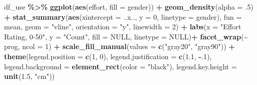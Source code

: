 \documentclass[
]{article}
\newenvironment{Shaded}{\begin{snugshade}}{\end{snugshade}}
\newcommand{\AttributeTok}[1]{\textcolor[rgb]{0.13,0.29,0.53}{#1}}
\newcommand{\ConstantTok}[1]{\textcolor[rgb]{0.56,0.35,0.01}{#1}}
\newcommand{\DecValTok}[1]{\textcolor[rgb]{0.00,0.00,0.81}{#1}}
\newcommand{\FloatTok}[1]{\textcolor[rgb]{0.00,0.00,0.81}{#1}}
\newcommand{\FunctionTok}[1]{\textcolor[rgb]{0.13,0.29,0.53}{\textbf{#1}}}
\newcommand{\NormalTok}[1]{#1}
\newcommand{\SpecialCharTok}[1]{\textcolor[rgb]{0.81,0.36,0.00}{\textbf{#1}}}
\newcommand{\StringTok}[1]{\textcolor[rgb]{0.31,0.60,0.02}{#1}}
\begin{document}
\clearpage

\begin{Shaded}
\begin{Highlighting}[]
\NormalTok{df\_use }\SpecialCharTok{\%\textgreater{}\%} 
  \FunctionTok{ggplot}\NormalTok{(}\FunctionTok{aes}\NormalTok{(effort,}
             \AttributeTok{fill =}\NormalTok{ gender)) }\SpecialCharTok{+} 
  \FunctionTok{geom\_density}\NormalTok{(}\AttributeTok{alpha =}\NormalTok{ .}\DecValTok{5}\NormalTok{) }\SpecialCharTok{+}  
  \FunctionTok{stat\_summary}\NormalTok{(}\FunctionTok{aes}\NormalTok{(}\AttributeTok{xintercept =}\NormalTok{ ..x.., }
                   \AttributeTok{y =} \DecValTok{0}\NormalTok{,}
                   \AttributeTok{linetype =}\NormalTok{ gender), }
               \AttributeTok{fun =}\NormalTok{ mean, }
               \AttributeTok{geom =} \StringTok{"vline"}\NormalTok{, }
               \AttributeTok{orientation =} \StringTok{"y"}\NormalTok{,}
               \AttributeTok{linewidth =} \DecValTok{2}\NormalTok{) }\SpecialCharTok{+}
  \FunctionTok{labs}\NormalTok{(}\AttributeTok{x =} \StringTok{"Effort Rating, 0{-}50"}\NormalTok{,}
       \AttributeTok{y =} \StringTok{"Count"}\NormalTok{,}
       \AttributeTok{fill =} \ConstantTok{NULL}\NormalTok{,}
       \AttributeTok{linetype =} \ConstantTok{NULL}\NormalTok{)}\SpecialCharTok{+}
  \FunctionTok{facet\_wrap}\NormalTok{(}\SpecialCharTok{\textasciitilde{}}\NormalTok{ prog, }\AttributeTok{ncol =} \DecValTok{1}\NormalTok{) }\SpecialCharTok{+}
  \FunctionTok{scale\_fill\_manual}\NormalTok{(}\AttributeTok{values =} \FunctionTok{c}\NormalTok{(}\StringTok{"gray20"}\NormalTok{, }\StringTok{"gray90"}\NormalTok{)) }\SpecialCharTok{+}
  \FunctionTok{theme}\NormalTok{(}\AttributeTok{legend.position =} \FunctionTok{c}\NormalTok{(}\DecValTok{1}\NormalTok{, }\DecValTok{0}\NormalTok{),}
        \AttributeTok{legend.justification =} \FunctionTok{c}\NormalTok{(}\FloatTok{1.1}\NormalTok{, }\SpecialCharTok{{-}}\NormalTok{.}\DecValTok{1}\NormalTok{),}
        \AttributeTok{legend.background =} \FunctionTok{element\_rect}\NormalTok{(}\AttributeTok{color =} \StringTok{"black"}\NormalTok{),}
        \AttributeTok{legend.key.height =} \FunctionTok{unit}\NormalTok{(}\FloatTok{1.5}\NormalTok{, }\StringTok{"cm"}\NormalTok{))}
\end{Highlighting}
\end{Shaded}
\end{document}
